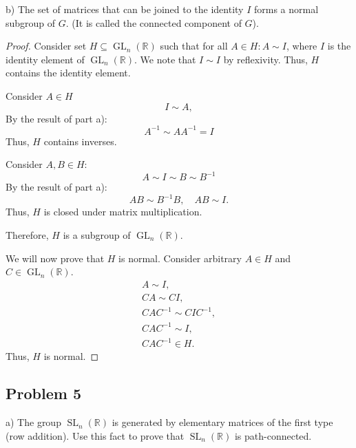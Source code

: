 \documentclass{article}
\theoremstyle{definition}
\newcommand{\R}{\mathbb{R}}
\newcommand{\GL}{\operatorname{GL}}
\newcommand{\SL}{\operatorname{SL}}
\newcommand{\GLnR}{\GL_n(\R)}
\newcommand{\SLnR}{\SL_n(\R)}
\begin{document}
\begin{tcolorbox}
b) The set of matrices that can be joined to the identity $I$ forms a normal subgroup of $G$. (It is called the connected component of $G$).
\end{tcolorbox}

\begin{proof}

Consider set $H \subseteq \GLnR$ such that for all $A \in H : A \sim I$, where $I$ is the identity element of $\GLnR$.
We note that $I \sim I$ by reflexivity.
Thus, $H$ contains the identity element.

Consider $A \in H$
\[ I \sim A, \]
By the result of part a):
\[  A^{-1} \sim A A^{-1} = I \]
Thus, $H$ contains inverses.

Consider $A,B \in H$:
\[ A \sim I \sim B \sim B^{-1} \]
By the result of part a):
\[ AB \sim B^{-1} B, \quad AB \sim I. \]
Thus, $H$ is closed under matrix multiplication.

Therefore, $H$ is a subgroup of $\GLnR$.

We will now prove that $H$ is normal. Consider arbitrary $A \in H$ and $C \in \GLnR$.
\begin{gather*}
    A \sim I, \\
    CA \sim CI, \\
    CAC^{-1} \sim CIC^{-1}, \\
    CAC^{-1} \sim I, \\
    CAC^{-1} \in H.
\end{gather*}
Thus, $H$ is normal.

\end{proof}


\subsection*{Problem 5}

\begin{tcolorbox}
a) The group $\SLnR$ is generated by elementary matrices of the first type (row addition).
Use this fact to prove that $\SLnR$ is path-connected.
\end{tcolorbox}
\end{document}
